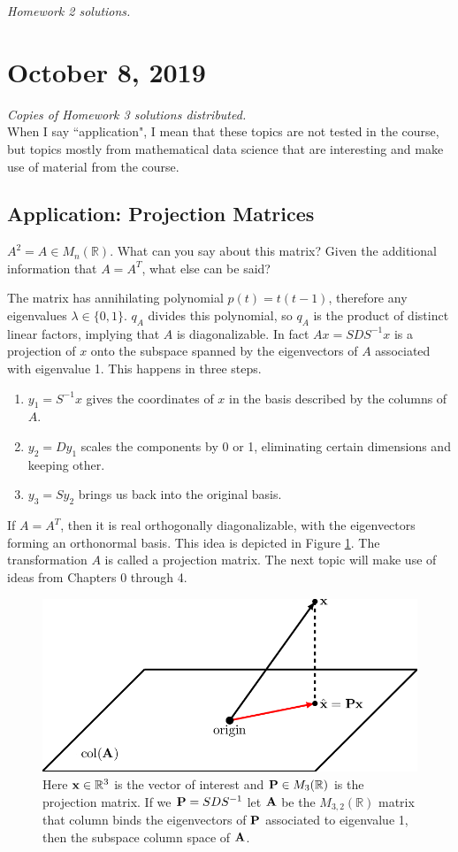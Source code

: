 \documentclass[11pt]{article}
\newcommand{\R}{\ensuremath{\mathbb R}}
\theoremstyle{plain}
\theoremstyle{definition}
\theoremstyle{remark}
\begin{document}
{\it Homework 2 solutions.}

\section{October 8, 2019}

{\it Copies of Homework 3 solutions distributed.}\\

When I say ``application", I mean that these topics are not tested in the course, but topics mostly from mathematical data science that are interesting and make use of material from the course.

\subsection*{Application: Projection Matrices} 

$A^2 = A \in M_n(\R)$. What can you say about this matrix? Given the additional information that $A = A^T$, what else can be said?

The matrix has annihilating polynomial $p(t) = t(t-1)$, therefore any eigenvalues $\lambda \in \{0,1\}$. $q_A$ divides this polynomial, so $q_A$ is the product of distinct linear factors, implying that $A$ is diagonalizable. In fact $Ax = SDS^{-1}x$ is a projection of $x$ onto the subspace spanned by the eigenvectors of $A$ associated with eigenvalue 1. This happens in three steps.
\begin{enumerate}
    \item $y_1 = S^{-1}x$ gives the coordinates of $x$ in the basis described by the columns of $A$.
    \item $y_2 = Dy_1$ scales the components by 0 or 1, eliminating certain dimensions and keeping other.
    \item $y_3 = Sy_2$ brings us back into the original basis.
\end{enumerate}
If $A = A^T$, then it is real orthogonally diagonalizable, with the eigenvectors forming an orthonormal basis. This idea is depicted in Figure \ref{fig:proj}. The transformation $A$ is called a projection matrix. The next topic will make use of ideas from Chapters 0 through 4.

\begin{figure}[ht!]
    \centering
    \includegraphics[width=0.6\linewidth]{figures/projection.png}
    \caption{Here ${\bf x} \in \R^3$ is the vector of interest and ${\bf P} \in M_3(\R)$ is the projection matrix. If we ${\bf P} = SDS^{-1}$ let ${\bf A}$ be the $M_{3,2}(\R)$ matrix that column binds the eigenvectors of ${\bf P}$ associated to eigenvalue 1, then the subspace column space of ${\bf A}$.}
    \label{fig:proj}
\end{figure}
\end{document}
